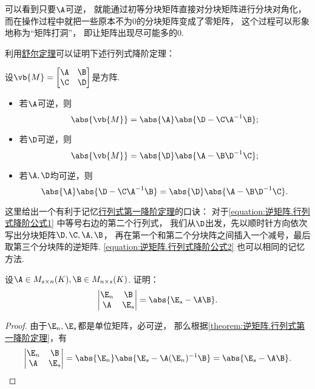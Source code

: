 可以看到只要\(\A\)可逆，
就能通过初等分块矩阵直接对分块矩阵进行分块对角化，
而在操作过程中就把一些原本不为0的分块矩阵变成了零矩阵，
这个过程可以形象地称为“矩阵打洞”，
即让矩阵出现尽可能多的0.

利用\hyperref[theorem:逆矩阵.舒尔定理]{舒尔定理}可以证明下述行列式降阶定理：
\begin{theorem}[行列式第一降阶定理]\label{theorem:逆矩阵.行列式第一降阶定理}
\def\M{\vb{M}}
设\(\M = \begin{bmatrix}
	\A & \B \\
	\C & \D
\end{bmatrix}\)是方阵.
\begin{itemize}
	\item 若\(\A\)可逆，则\begin{equation}\label{equation:逆矩阵.行列式降阶公式1}
		\abs{\M} = \abs{\A} \abs{\D - \C \A^{-1} \B};
	\end{equation}

	\item 若\(\D\)可逆，则\begin{equation}\label{equation:逆矩阵.行列式降阶公式2}
		\abs{\M} = \abs{\D} \abs{\A - \B \D^{-1} \C};
	\end{equation}

	\item 若\(\A,\D\)均可逆，则\begin{equation}
		\abs{\A} \abs{\D - \C \A^{-1} \B}
		= \abs{\D} \abs{\A - \B \D^{-1} \C}.
	\end{equation}
\end{itemize}
\end{theorem}
\begin{remark}
这里给出一个有利于记忆\hyperref[theorem:逆矩阵.行列式第一降阶定理]{行列式第一降阶定理}的口诀：
对于\cref{equation:逆矩阵.行列式降阶公式1} 中等号右边的第二个行列式，
我们从\(\D\)出发，先以顺时针方向依次写出分块矩阵\(\D,\C,\A,\B\)，
再在第一个和第二个分块阵之间插入一个减号，最后取第三个分块阵的逆矩阵.
\cref{equation:逆矩阵.行列式降阶公式2} 也可以相同的记忆方法.
\end{remark}

\begin{example}\label{example:逆矩阵.行列式降阶定理的重要应用1}
设\(\A \in M_{s \times n}(K),
\B \in M_{n \times s}(K)\).
证明：\[
	\begin{vmatrix}
		\E_n & \B \\
		\A & \E_s
	\end{vmatrix} = \abs{\E_s - \A\B}.
\]
\begin{proof}
由于\(\E_n,\E_s\)都是单位矩阵，必可逆，
那么根据\cref{theorem:逆矩阵.行列式第一降阶定理}，有\[
	\begin{vmatrix}
		\E_n & \B \\
		\A & \E_s
	\end{vmatrix}
	= \abs{\E_n} \abs{\E_s - \A(\E_n)^{-1}\B}
	= \abs{\E_s - \A\B}.
	\qedhere
\]
\end{proof}
\end{example}

